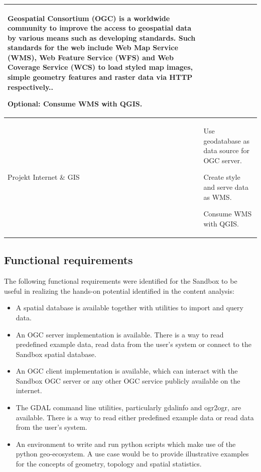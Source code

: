 \documentclass[11pt, a4paper, oneside, parskip=full-]{scrartcl}
\begin{document}
\begin{table}[!htbp]
\begin{tabularx}{\textwidth}{lX}
\begin{itemize}[left=0pt,nosep,before={\begin{minipage}[t]{\hsize}},after
      ={\end{minipage}}]
{      Geospatial Consortium (OGC) is a worldwide community to improve the access
      to geospatial data by various means such as developing standards. Such
      standards for the web include Web Map Service (WMS), Web Feature Service
      (WFS) and Web Coverage Service (WCS) to load styled map images, simple
      geometry features and raster data via HTTP respectively.}.
      \item Optional: Consume WMS with QGIS. \end{itemize}\nointerlineskip \\
    \midrule
    Projekt Internet \& GIS &
      \begin{itemize}[left=0pt,nosep,before={\begin{minipage}[t]{\hsize}},after
      ={\end{minipage}}]
      \item Use geodatabase as data source for OGC server.
      \item Create style and serve data as WMS.
      \item Consume WMS with QGIS. \end{itemize}\nointerlineskip \\
    \bottomrule
  \end{tabularx}%
\end{table}%

\subsection{Functional requirements}
The following functional requirements were identified for the Sandbox to be
useful in realizing the hands-on potential identified in the content analysis:
\begin{itemize}
  \item A spatial database is available together with utilities to import and
  query data.
  \item An OGC server implementation is available. There is a way to read
  predefined example data, read data from the user's system or connect to the
  Sandbox spatial database.
  \item An OGC client implementation is available, which can interact with the
  Sandbox OGC server or any other OGC service publicly available on the
  internet.
  \item The GDAL command line utilities, particularly gdalinfo and ogr2ogr, are
  available. There is a way to read either predefined example data or read data
  from the user's system.
  \item An environment to write and run python scripts which make use of the
  python geo-ecosystem. A use case would be to provide illustrative examples for
  the concepts of geometry, topology and spatial statistics.
\end{itemize}
\end{document}
